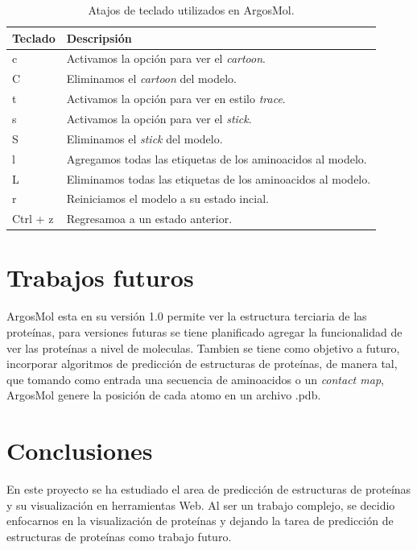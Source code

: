 \documentclass{article}
\begin{document}
\begin{table}[H]
	
	\begin{tabular}{p{2.1cm} p{12.6cm}}
		\textbf{Teclado} & \textbf{Descripsión}   \\
		\hline 
		c & Activamos la opción para ver el \textit{cartoon}. \\
		C & Eliminamos el \textit{cartoon} del modelo. \\
		t & Activamos la opción para ver en estilo \textit{trace}. \\
		s & Activamos la opción para ver el \textit{stick}. \\ 
		S & Eliminamos el \textit{stick} del modelo. \\
		l & Agregamos todas las etiquetas de los aminoacidos al modelo. \\
		L & Eliminamos todas las etiquetas de los aminoacidos al modelo. \\
		r & Reiniciamos el modelo a su estado incial. \\
		Ctrl + z & Regresamoa a un estado anterior. \\
		\hline
	\end{tabular}
	\caption{Atajos de teclado utilizados en ArgosMol.}
	\label{tab:tecalado}
\end{table}	
	
\section{Trabajos futuros}
ArgosMol esta en su versión 1.0 permite ver la estructura terciaria de las proteínas, para versiones futuras se tiene planificado agregar la funcionalidad de ver las proteínas a nivel de moleculas. Tambien se tiene como objetivo a futuro, incorporar algoritmos de predicción de estructuras de proteínas, de manera tal, que tomando como entrada una secuencia de aminoacidos o un \textit{contact map}, ArgosMol genere la posición de cada atomo en un archivo .pdb.

\section{Conclusiones}

En este proyecto se ha estudiado el area de predicción de estructuras de proteínas y su visualización en herramientas Web. Al ser un trabajo complejo, se decidio enfocarnos en la visualización de proteínas y dejando la tarea de predicción de estructuras de proteínas como trabajo futuro.\\
\end{document}
